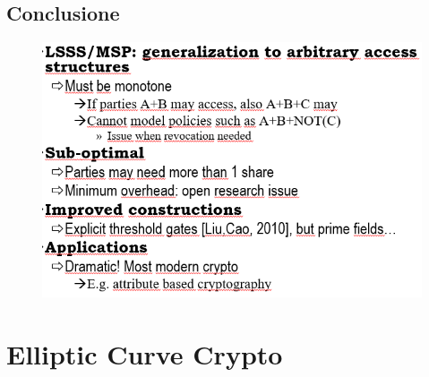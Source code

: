 \documentclass{book}
\begin{document}
\section{Conclusione}
\begin{figure}[th]
    \centering
    \includegraphics[scale=1]{2022-01-08-19-39-12.png}%
\end{figure}
\chapter{Elliptic Curve Crypto}
\end{document}
